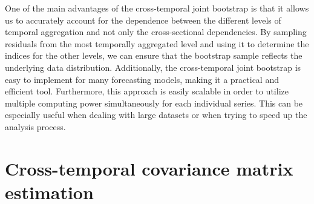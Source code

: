 \documentclass[review, 11pt]{elsarticle}
\theoremstyle{definition}
\begin{document}
One of the main advantages of the cross-temporal joint bootstrap is that it allows us to accurately account for the dependence between the different levels of temporal aggregation and not only the cross-sectional dependencies. By sampling residuals from the most temporally aggregated level and using it to determine the indices for the other levels, we can ensure that the bootstrap sample reflects the underlying data distribution. Additionally, the cross-temporal joint bootstrap is easy to implement %
for many forecasting models, making it a practical and efficient tool. Furthermore, this approach is easily scalable in order to utilize multiple computing power simultaneously for each individual series. This can be especially useful when dealing with large datasets or when trying to speed up the analysis process.

\section{Cross-temporal covariance matrix estimation}\label{sec:shrtech}
\end{document}
